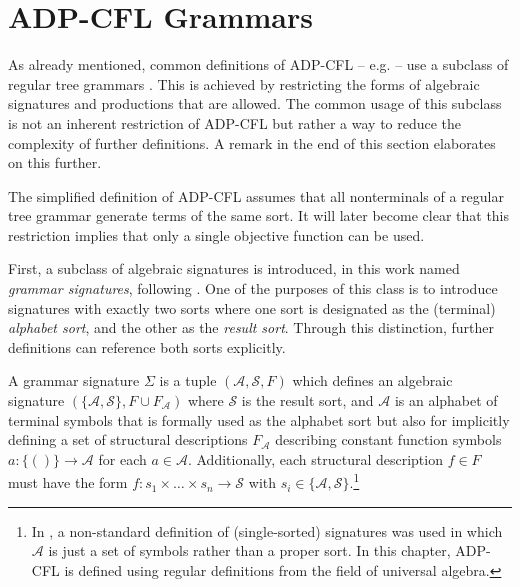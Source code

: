 \documentclass[
    a4paper,
    12pt,
    twoside,
    BCOR=12mm,
    parskip=half,
    chapterprefix,
    numbers=noenddot,
    bibliography=totoc
]{scrbook}
\begin{document}
\section{ADP-CFL Grammars}

As already mentioned, common definitions of ADP-CFL -- e.g. \citet{honer_zu_siederdissen_sneaking_2012,sauthoff_bellmans_2011,giegerich_discipline_2004} -- use a subclass of regular tree grammars . This is achieved by restricting the forms of algebraic signatures and productions that are allowed. The common usage of this subclass is not an inherent restriction of ADP-CFL but rather a way to reduce the complexity of further definitions. A remark in the end of this section elaborates on this further.

The simplified definition of ADP-CFL assumes that all nonterminals of a regular tree grammar generate terms of the same sort. It will later become clear that this restriction implies that only a single objective function can be used.

First, a subclass of algebraic signatures is introduced, in this work named \emph{grammar signatures}, following \citet[sect. 3.1]{giegerich_discipline_2004}. One of the purposes of this class is to introduce signatures with exactly two sorts where one sort is designated as the (terminal) \emph{alphabet sort}, and the other as the \emph{result sort}. Through this distinction, further definitions can reference both sorts explicitly.

\begin{definition}
	A grammar signature $\Sigma$ is a tuple $(\mathcal{A},\mathcal{S},F)$ which defines an algebraic signature $(\{\mathcal{A},\mathcal{S}\},F \cup F_\mathcal{A})$ where $\mathcal{S}$ is the result sort, and $\mathcal{A}$ is an alphabet of terminal symbols that is formally used as the alphabet sort but also for implicitly defining a set of structural descriptions $F_\mathcal{A}$ describing constant function symbols $a: \{()\} \to \mathcal{A}$ for each $a \in \mathcal{A}$. Additionally, each structural description $f \in F$ must have the form $f: s_1 \times \ldots \times s_n \to \mathcal{S}$ with $s_i \in \{\mathcal{A},\mathcal{S}\}$.\footnote{In \citet{giegerich_discipline_2004}, a non-standard definition of (single-sorted) signatures was used in which $\mathcal{A}$ is just a set of symbols rather than a proper sort. In this chapter, ADP-CFL is defined using regular definitions from the field of universal algebra.}
\end{definition}
\end{document}
